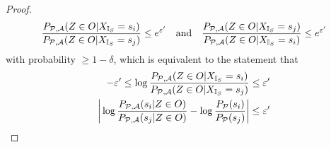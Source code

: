 \begin{proof}
\begin{align*}
		 \frac{P_{\mathcal{P}, \mathcal{A}}(Z \in O | {X_{\mathbb{I}_S}} = s_i)}{P_{\mathcal{P},\mathcal{A}}(Z \in O | {X_{\mathbb{I}_S}} = s_j)} \leq e^{\varepsilon'}
		 \quad \text{and} \quad
		 \frac{P_{\mathcal{P}, \mathcal{A}}(Z \in O | {X_{\mathbb{I}_S}} = s_j)}{P_{\mathcal{P},\mathcal{A}}(Z \in O | {X_{\mathbb{I}_S}} = s_i)} \leq e^{\varepsilon'}
	\end{align*}
	with probability $\geq 1 - \delta$, which is equivalent to the statement that 
	\begin{align*}
		-\varepsilon' 
		\leq \log  \frac{P_{\mathcal{P}, \mathcal{A}}(Z \in O | {X_{\mathbb{I}_S}} = s_i)}{P_{\mathcal{P},\mathcal{A}}(Z \in O | {X_{\mathbb{I}_S}} = s_j)}
		&\leq \varepsilon' \\
		\bigg| \log \frac{P_{\mathcal{P}, \mathcal{A}}(s_i | Z \in O)}{P_{\mathcal{P}, \mathcal{A}}(s_j | Z \in O)} - \log \frac{P_{\mathcal{P}}(s_i)}{P_{\mathcal{P}}(s_j)} \bigg| 
		&\leq \varepsilon'
	\end{align*}
\end{proof}

